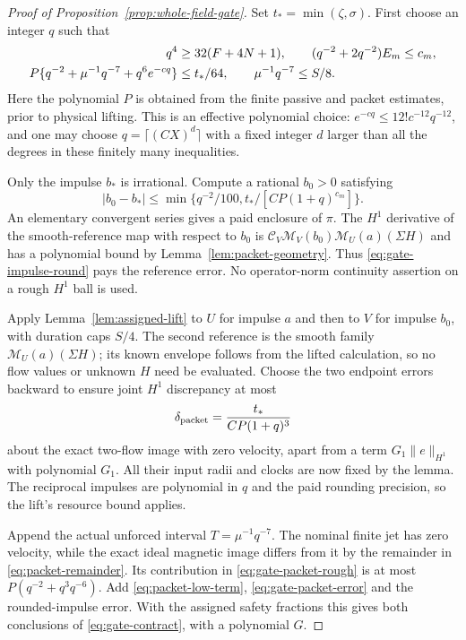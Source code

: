 \documentclass[11pt,a4paper]{amsart}
\theoremstyle{definition}
\theoremstyle{remark}
\numberwithin{equation}{section}
\newcommand{\Ccal}{\mathcal C}
\newcommand{\Mcal}{\mathcal M}
\newcommand{\norm}[1]{\lVert #1\rVert}
\begin{document}
\begin{proof}[Proof of Proposition~\ref{prop:whole-field-gate}]
Set $t_*=\min(\zeta,\sigma)$.  First choose an integer $q$ such that
\begin{align}\label{eq:gate-q-choice}
 q^4&\ge32(F+4N+1),\qquad
 (q^{-2}+2q^{-2})E_m\le c_m,\notag\\
 P\{q^{-2}+\mu^{-1}q^{-7}+q^6e^{-cq}\}&\le t_*/64,
 \qquad \mu^{-1}q^{-7}\le S/8.
\end{align}
Here the polynomial $P$ is obtained from the finite passive and packet
estimates, prior to physical lifting.  This is an effective polynomial
choice: $e^{-cq}\le12!c^{-12}q^{-12}$, and one may choose
$q=\lceil(CX)^d\rceil$ with a fixed integer $d$ larger than all the degrees
in these finitely many inequalities.

Only the impulse $b_*$ is irrational.  Compute a rational $b_0>0$ satisfying
\begin{equation}\label{eq:gate-impulse-round}
 |b_0-b_*|\le\min\{q^{-2}/100,
                       t_*/[CP(1+q)^{c_m}]\}.
\end{equation}
An elementary convergent series gives a paid enclosure of $\pi$.  The
$H^1$ derivative of the smooth-reference map with respect to $b_0$ is
$\Ccal_V\Mcal_V(b_0)\Mcal_U(a)(\Sigma H)$ and has a polynomial bound
by Lemma~\ref{lem:packet-geometry}.  Thus \eqref{eq:gate-impulse-round}
pays the reference error.  No operator-norm continuity assertion on a rough
$H^1$ ball is used.

Apply Lemma~\ref{lem:assigned-lift} to $U$ for impulse $a$ and then to $V$
for impulse $b_0$, with duration caps $S/4$.  The second reference is the
smooth family $\Mcal_U(a)(\Sigma H)$; its known envelope follows from the
lifted calculation, so no flow values or unknown $H$ need be evaluated.
Choose the two endpoint errors backward to ensure joint $H^1$ discrepancy
at most
\[
 \delta_{\rm packet}=\frac{t_*}{CP(1+q)^3}
\]
about the exact two-flow image with zero velocity, apart from a term
$G_1\norm e_{H^1}$ with polynomial $G_1$.  All their input radii and clocks
are now fixed by the lemma.  The reciprocal impulses are polynomial in $q$
and the paid rounding precision, so the lift's resource bound applies.

Append the actual unforced interval $T=\mu^{-1}q^{-7}$.  The nominal finite
jet has zero velocity, while the exact ideal magnetic image differs from it
by the remainder in \eqref{eq:packet-remainder}.  Its contribution in
\eqref{eq:gate-packet-rough} is at most
$P(q^{-2}+q^3q^{-6})$.  Add \eqref{eq:packet-low-term},
\eqref{eq:gate-packet-error} and the rounded-impulse error.  With the
assigned safety fractions this gives both conclusions of
\eqref{eq:gate-contract}, with a polynomial $G$.


\end{proof}
\end{document}
